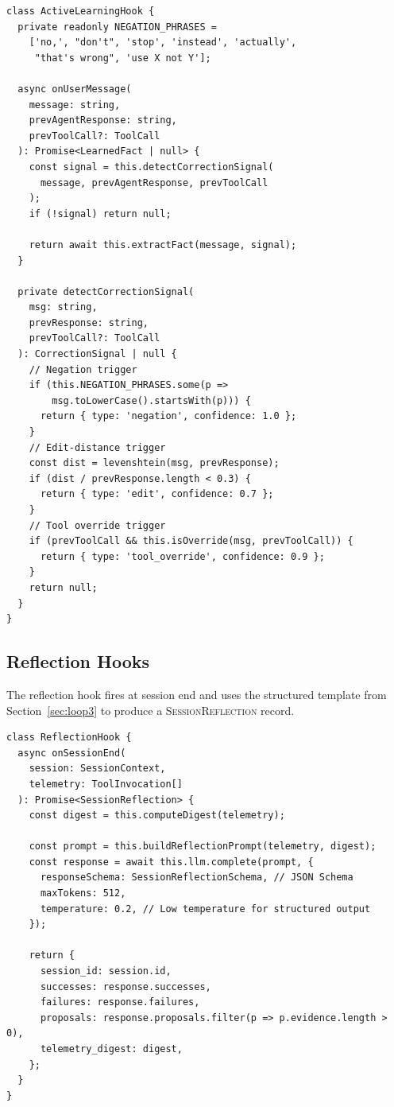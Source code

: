\begin{verbatim}
class ActiveLearningHook {
  private readonly NEGATION_PHRASES =
    ['no,', "don't", 'stop', 'instead', 'actually',
     "that's wrong", 'use X not Y'];

  async onUserMessage(
    message: string,
    prevAgentResponse: string,
    prevToolCall?: ToolCall
  ): Promise<LearnedFact | null> {
    const signal = this.detectCorrectionSignal(
      message, prevAgentResponse, prevToolCall
    );
    if (!signal) return null;

    return await this.extractFact(message, signal);
  }

  private detectCorrectionSignal(
    msg: string,
    prevResponse: string,
    prevToolCall?: ToolCall
  ): CorrectionSignal | null {
    // Negation trigger
    if (this.NEGATION_PHRASES.some(p =>
        msg.toLowerCase().startsWith(p))) {
      return { type: 'negation', confidence: 1.0 };
    }
    // Edit-distance trigger
    const dist = levenshtein(msg, prevResponse);
    if (dist / prevResponse.length < 0.3) {
      return { type: 'edit', confidence: 0.7 };
    }
    // Tool override trigger
    if (prevToolCall && this.isOverride(msg, prevToolCall)) {
      return { type: 'tool_override', confidence: 0.9 };
    }
    return null;
  }
}
\end{verbatim}

\subsection{Reflection Hooks}

The reflection hook fires at session end and uses the structured template
from Section~\ref{sec:loop3} to produce a \textsc{SessionReflection} record.

\begin{verbatim}
class ReflectionHook {
  async onSessionEnd(
    session: SessionContext,
    telemetry: ToolInvocation[]
  ): Promise<SessionReflection> {
    const digest = this.computeDigest(telemetry);

    const prompt = this.buildReflectionPrompt(telemetry, digest);
    const response = await this.llm.complete(prompt, {
      responseSchema: SessionReflectionSchema, // JSON Schema
      maxTokens: 512,
      temperature: 0.2, // Low temperature for structured output
    });

    return {
      session_id: session.id,
      successes: response.successes,
      failures: response.failures,
      proposals: response.proposals.filter(p => p.evidence.length > 0),
      telemetry_digest: digest,
    };
  }
}
\end{verbatim}

